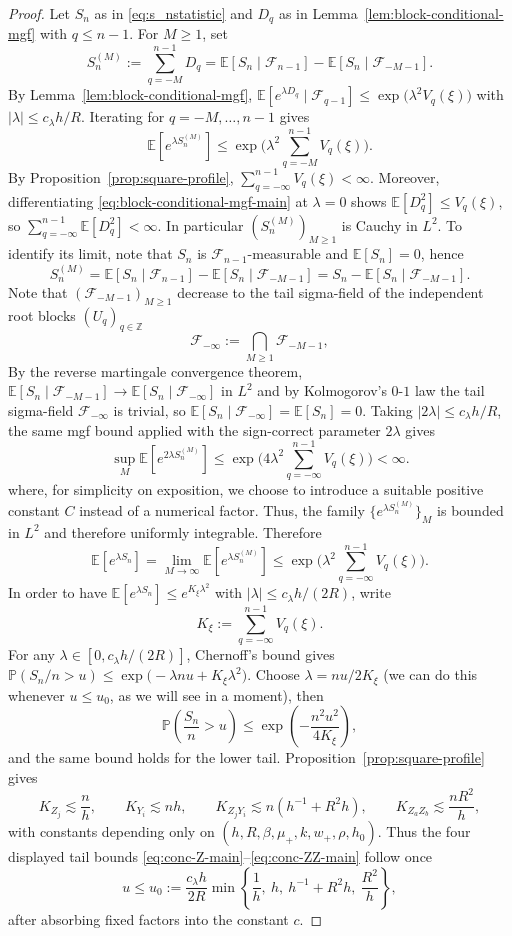 \documentclass{article}
\newcommand{\Pbb}{\mathbb{P}}
\newcommand{\E}{\mathbb{E}}
\begin{document}
\begin{proof}
Let $S_n$ as in \eqref{eq:s_nstatistic} and $D_q$ as in Lemma~\ref{lem:block-conditional-mgf} with $q\le n-1$. For $M\ge 1$, set
\[
S_n^{(M)}:=\sum_{q=-M}^{n-1} D_q=\mathbb E[S_n\mid \mathcal F_{n-1}]-\mathbb E[S_n\mid \mathcal F_{-M-1}].
\]
By Lemma~\ref{lem:block-conditional-mgf}, $\mathbb E[e^{\lambda D_q}\mid \mathcal F_{q-1}]\le \exp\big(\lambda^2 V_q(\xi)\big)$ with $|\lambda|\le c_\lambda h/R$. Iterating for $q=-M,\dots,n-1$ gives
\[
\E[e^{\lambda S_n^{(M)}}]\le \exp\Big(\lambda^2\sum_{q=-M}^{n-1}V_q(\xi)\Big).
\]    
By Proposition~\ref{prop:square-profile}, $\sum_{q=-\infty}^{n-1}V_q(\xi)<\infty$. Moreover, differentiating \eqref{eq:block-conditional-mgf-main} at $\lambda=0$ shows $\E[D_q^2]\le V_q(\xi)$, so $\sum_{q=-\infty}^{n-1}\E[D_q^2]<\infty$. In particular $(S_n^{(M)})_{M\ge 1}$ is Cauchy in $L^2$. To identify its limit, note that $S_n$ is $\mathcal F_{n-1}$-measurable and $\E[S_n]=0$, hence
\[
S_n^{(M)}=\E[S_n\mid \mathcal F_{n-1}]-\E[S_n\mid \mathcal F_{-M-1}]=S_n-\E[S_n\mid \mathcal F_{-M-1}].
\]
Note that $(\mathcal F_{-M-1})_{M\ge 1}$ decrease to the tail sigma-field of the independent root blocks $(U_q)_{q\in\mathbb Z}$
\[
\mathcal F_{-\infty}:=\bigcap_{M\ge 1}\mathcal F_{-M-1},
\]
By the reverse martingale convergence theorem,
$\mathbb E[S_n\mid \mathcal F_{-M-1}]\to \E[S_n\mid \mathcal F_{-\infty}]$ in $L^2$ and by Kolmogorov's $0$-$1$ law the tail sigma-field $\mathcal F_{-\infty}$ is trivial, so $\E[S_n\mid \mathcal F_{-\infty}]=\E[S_n]=0$. Taking $|2\lambda|\le c_\lambda h/R$, the same mgf bound applied with the sign-correct parameter $2\lambda$ gives
\[
\sup_M \mathbb E[e^{2\lambda S_n^{(M)}}]\le \exp\Big(4\lambda^2\sum_{q=-\infty}^{n-1}V_q(\xi)\Big)<\infty.
\]
where, for simplicity on exposition, we choose to introduce a suitable positive constant $C$ instead of a numerical factor.
Thus, the family $\{e^{\lambda S_n^{(M)}}\}_M$ is bounded in $L^2$ and therefore uniformly integrable. Therefore
\[
\E[e^{\lambda S_n}] = \lim_{M\to\infty} \E[e^{\lambda S_n^{(M)}}]
\le \exp\Big(\lambda^2\sum_{q=-\infty}^{n-1}V_q(\xi)\Big).
\]
In order to have $\E[e^{\lambda S_n}]\le e^{K_\xi\lambda^2}$ with $|\lambda|\le c_\lambda h/(2R)$, write
\[
K_\xi:=\sum_{q=-\infty}^{n-1}V_q(\xi).
\]
For any $\lambda\in[0,c_\lambda h/(2R)]$, Chernoff's bound gives $\Pbb\!\left(S_n/n>u\right)\le \exp\!\bigl(-\lambda n u+K_\xi\lambda^2\bigr)$. Choose $\lambda=nu/2K_\xi$ (we can do this whenever $u\le u_0$, as we will see in a moment), then
\[
\Pbb\!\left(\frac{S_n}{n}>u\right)\le \exp\!\left(-\frac{n^2u^2}{4K_\xi}\right),
\]
and the same bound holds for the lower tail. Proposition~\ref{prop:square-profile} gives
\[
K_{Z_j}\lesssim \frac{n}{h},
\qquad
K_{Y_i}\lesssim nh,
\qquad
K_{Z_jY_i}\lesssim n(h^{-1}+R^2 h),
\qquad
K_{Z_aZ_b}\lesssim \frac{nR^2}{h},
\]
with constants depending only on $(h,R,\beta,\mu_+,k,w_+,\rho,h_0)$. Thus the four displayed tail bounds \eqref{eq:conc-Z-main}--\eqref{eq:conc-ZZ-main} follow once
\[
u\le u_0:=\frac{c_\lambda h}{2R}
\min\!\left\{\frac1h,\ h,\ h^{-1}+R^2 h,\ \frac{R^2}{h}\right\},
\]
after absorbing fixed factors into the constant $c$.
\end{proof}
\end{document}
